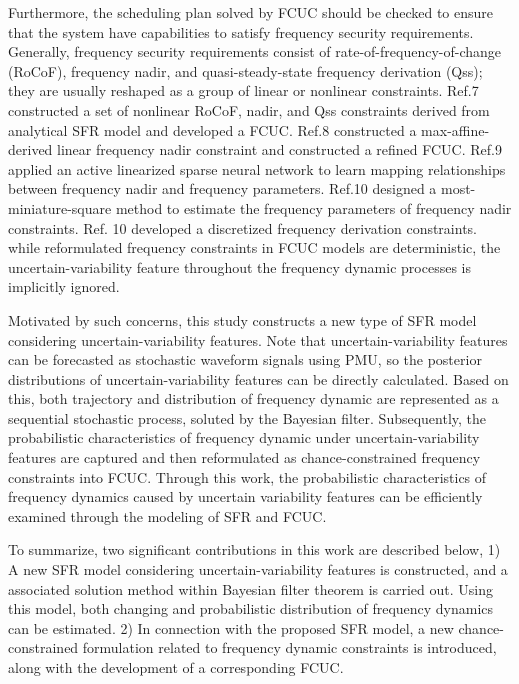 \documentclass[lettersize,journal]{IEEEtran}
\begin{document}
Furthermore, the scheduling plan solved by FCUC should be checked to ensure that the system have capabilities to satisfy frequency security requirements. Generally, frequency security requirements
consist of rate-of-frequency-of-change (RoCoF), frequency nadir, and quasi-steady-state frequency derivation (Qss); they are usually reshaped as a group of linear or nonlinear constraints.  Ref.7
constructed a set of nonlinear RoCoF, nadir, and Qss constraints derived from analytical SFR model and developed a FCUC.  Ref.8 constructed a max-affine-derived linear frequency nadir constraint and
constructed a refined FCUC.  Ref.9 applied an active linearized sparse neural network to learn mapping relationships between frequency nadir and frequency parameters.  Ref.10 designed a
most-miniature-square method to estimate the frequency parameters of frequency nadir constraints.  Ref. 10 developed a discretized frequency derivation constraints.  while reformulated frequency
constraints in FCUC models are deterministic, the uncertain-variability feature throughout the frequency dynamic processes is implicitly ignored.

Motivated by such concerns, this study constructs a new type of SFR model considering uncertain-variability features.  Note that uncertain-variability features can be forecasted as stochastic waveform
signals using PMU, so the posterior distributions of uncertain-variability features can be directly calculated. Based on this, both trajectory and distribution of frequency dynamic are represented as
a sequential stochastic process, soluted by the Bayesian filter.  Subsequently, the probabilistic characteristics of frequency dynamic under uncertain-variability features are captured and then
reformulated as chance-constrained frequency constraints into FCUC. Through this work, the probabilistic characteristics of frequency dynamics caused by uncertain variability features can be
efficiently examined through the modeling of SFR and FCUC.

To summarize, two significant contributions in this work are described below, 1) A new SFR model considering uncertain-variability features is constructed, and a associated solution method within
Bayesian filter theorem is carried out. Using this model, both changing and probabilistic distribution of frequency dynamics can be estimated.  2) In connection with the proposed SFR model, a new
chance-constrained formulation related to frequency dynamic constraints is introduced, along with the development of a corresponding FCUC.
\end{document}
